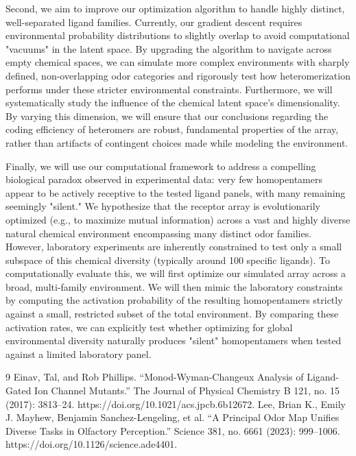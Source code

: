 \documentclass[
    reprint, %
    amsmath,
    amssymb,
    aps,
    prb,      %
    floatfix
]{revtex4-2}
\begin{document}
Second, we aim to improve our optimization algorithm to handle highly distinct, well-separated ligand families. Currently, our gradient descent requires environmental probability distributions to slightly overlap to avoid computational "vacuums" in the latent space. By upgrading the algorithm to navigate across empty chemical spaces, we can simulate more complex environments with sharply defined, non-overlapping odor categories and rigorously test how heteromerization performs under these stricter environmental constraints. Furthermore, we will systematically study the influence of the chemical latent space's dimensionality. By varying this dimension, we will ensure that our conclusions regarding the coding efficiency of heteromers are robust, fundamental properties of the array, rather than artifacts of contingent choices made while modeling the environment.

Finally, we will use our computational framework to address a compelling biological paradox observed in experimental data: very few homopentamers appear to be actively receptive to the tested ligand panels, with many remaining seemingly "silent." We hypothesize that the receptor array is evolutionarily optimized (e.g., to maximize mutual information) across a vast and highly diverse natural chemical environment encompassing many distinct odor families. However, laboratory experiments are inherently constrained to test only a small subspace of this chemical diversity (typically around 100 specific ligands). To computationally evaluate this, we will first optimize our simulated array across a broad, multi-family environment. We will then mimic the laboratory constraints by computing the activation probability of the resulting homopentamers strictly against a small, restricted subset of the total environment. By comparing these activation rates, we can explicitly test whether optimizing for global environmental diversity naturally produces "silent" homopentamers when tested against a limited laboratory panel.

\begin{thebibliography}{9}
    Einav, Tal, and Rob Phillips. “Monod-Wyman-Changeux Analysis of Ligand-Gated Ion Channel Mutants.” The Journal of Physical Chemistry B 121, no. 15 (2017): 3813–24. https://doi.org/10.1021/acs.jpcb.6b12672.
    Lee, Brian K., Emily J. Mayhew, Benjamin Sanchez-Lengeling, et al. “A Principal Odor Map Unifies Diverse Tasks in Olfactory Perception.” Science 381, no. 6661 (2023): 999–1006. https://doi.org/10.1126/science.ade4401.
    \label{LastBibItem}
\end{thebibliography}
\end{document}
